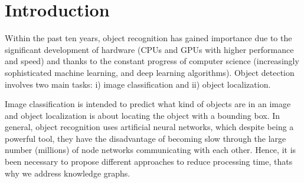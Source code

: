 \section{Introduction}
Within the past ten years, object recognition
has gained importance due to the significant development of 
hardware (CPUs and GPUs with higher performance and speed) and thanks to the 
constant progress of computer science (increasingly sophisticated machine 
learning, and deep learning algorithms). Object detection involves two main 
tasks: i) image classification and ii) object localization.

Image classification is intended to predict what kind of objects are in 
an image and object localization is about locating the object 
with a bounding box. In general, object recognition uses artificial 
neural networks, which despite being a powerful tool, they have the disadvantage 
of becoming slow through the large number (millions) of node networks 
communicating with each other. Hence, it is been necessary to propose different 
approaches to reduce processing time, thats why we address knowledge graphs.

